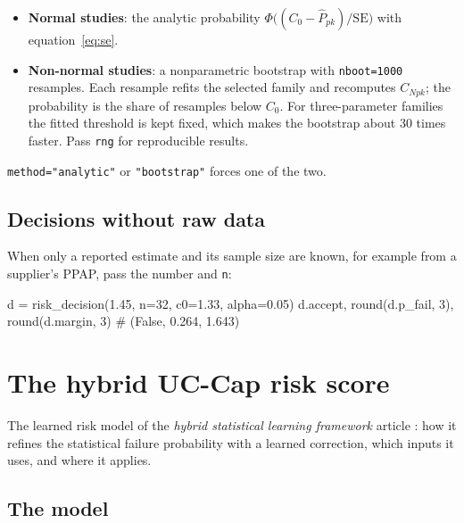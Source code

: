 \documentclass[a4paper,11pt,oneside,openany,parskip=half-,headings=standardclasses,toc=flat,numbers=noenddot]{scrbook}
\newcommand{\code}[1]{\texttt{\begingroup\def\_{\textunderscore\allowbreak}#1\endgroup}}
\newenvironment{chapterintro}{\begingroup\sffamily\small\color{muted}\noindent\ignorespaces}{\par\endgroup\medskip}
\newcommand{\Ppkhat}{\widehat{P}_{pk}}
\begin{document}
\begin{itemize}
\item \textbf{Normal studies}: the analytic probability $\Phi\bigl((C_0 - \Ppkhat)/\mathrm{SE}\bigr)$ with
  equation~\eqref{eq:se}.
\item \textbf{Non-normal studies}: a nonparametric bootstrap \cite{efron} with \code{n\_boot=1000} resamples. Each resample
  refits the selected family and recomputes $C_{Npk}$; the probability is the share of resamples below $C_0$.
  For three-parameter families the fitted threshold is kept fixed, which makes the bootstrap about 30 times
  faster. Pass \code{rng} for reproducible results.
\end{itemize}

\code{method="analytic"} or \code{"bootstrap"} forces one of the two.

\section{Decisions without raw data}
When only a reported estimate and its sample size are known, for example from a supplier's PPAP, pass the
number and \code{n}:

\begin{pycode}
d = risk_decision(1.45, n=32, c0=1.33, alpha=0.05)
d.accept, round(d.p_fail, 3), round(d.margin, 3)    # (False, 0.264, 1.643)
\end{pycode}

\chapter{The hybrid UC-Cap risk score}\label{ch:hybrid}

\begin{chapterintro}
The learned risk model of the \emph{hybrid statistical learning framework} article \cite{jy-hybrid}: how it
refines the statistical failure probability with a learned correction, which inputs it uses, and where it
applies.
\end{chapterintro}

\section{The model}
\end{document}
